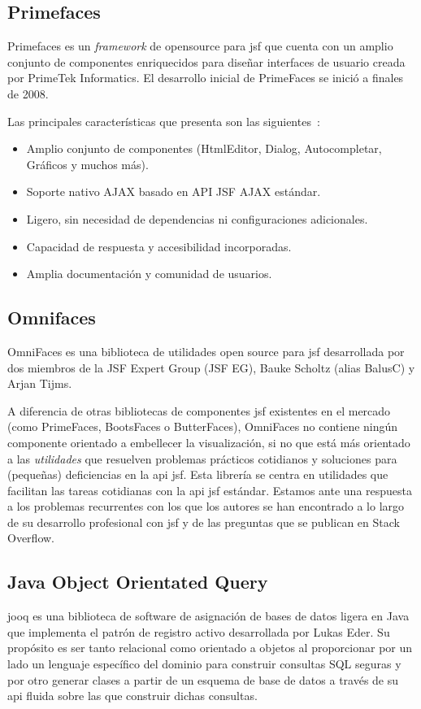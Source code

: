 \subsection{Primefaces}
\label{sec:primefaces}

Primefaces es un \emph{framework} de \gls{opensource} para \acrshort{jsf} que cuenta con un amplio conjunto de componentes enriquecidos para diseñar interfaces de usuario creada por PrimeTek Informatics. El desarrollo inicial de PrimeFaces se inició a finales de 2008.

Las principales características que presenta son las siguientes~\cite{Primefaces}:
\begin{itemize}
\item Amplio conjunto de componentes (HtmlEditor, Dialog, Autocompletar, Gráficos y muchos más).
\item Soporte nativo AJAX basado en API JSF AJAX estándar. 
\item Ligero, sin necesidad de dependencias ni configuraciones adicionales. 
\item Capacidad de respuesta y accesibilidad incorporadas. 
\item Amplia documentación y comunidad de usuarios.
\end{itemize}


\subsection{Omnifaces}
\label{sec:omnifaces}

OmniFaces es una biblioteca de utilidades open source para \acrshort{jsf} desarrollada por dos miembros de la JSF Expert Group (JSF EG), Bauke Scholtz (alias BalusC) y Arjan Tijms.

A diferencia de otras bibliotecas de componentes \acrshort{jsf}  existentes en el mercado (como PrimeFaces, BootsFaces o ButterFaces), OmniFaces no contiene ningún componente orientado a embellecer la visualización, si no que está más orientado a las \textit{utilidades} que resuelven problemas prácticos cotidianos y soluciones para (pequeñas) deficiencias en la \acrshort{api}  \acrshort{jsf}. Esta librería se centra en utilidades que facilitan las tareas cotidianas con la \acrshort{api} \acrshort{jsf} estándar. Estamos ante una respuesta a los problemas recurrentes con los que los autores se han encontrado a lo largo de su desarrollo profesional con \acrshort{jsf} y de las preguntas que se publican en Stack Overflow.

\subsection{Java Object Orientated Query}
\label{sec:jooq}
\acrfull{jooq} es una biblioteca de software de asignación de bases de datos ligera en Java que implementa el patrón de registro activo desarrollada por Lukas Eder. Su propósito es ser tanto relacional como orientado a objetos al proporcionar por un lado un lenguaje específico del dominio para construir consultas SQL seguras y por otro generar clases a partir de un esquema de base de datos a través de su \acrshort{api} fluida sobre las que construir dichas consultas.

